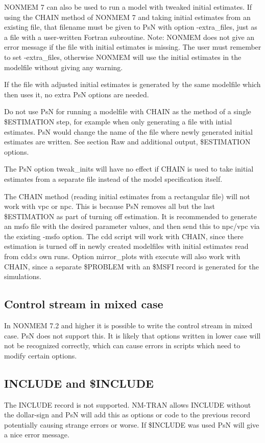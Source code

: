 	NONMEM 7 can also be used to run a model with tweaked initial estimates. If using the CHAIN method of NONMEM 7 and taking initial estimates from an existing file, that filename must be given to PsN with option -extra\_files, just as a file with a user-written Fortran subroutine. Note: NONMEM does not give an error message if the file with initial estimates is missing. The user must remember to set -extra\_files, otherwise NONMEM will use the initial estimates in the modelfile without giving any warning.
	
	If the file with adjusted initial estimates is generated by the same modelfile which then uses it, no extra PsN options are needed.
	
	Do not use PsN for running a modelfile with CHAIN as the method of a single \$ESTIMATION step, for example when only generating a file with intial estimates. PsN would change the name of the file where newly generated initial estimates are written. See section Raw and additional output, \$ESTIMATION options.
	
	The PsN option tweak\_inits will have no effect if CHAIN is used to take initial estimates from a separate file instead of the model specification itself.
	
	The CHAIN method (reading initial estimates from a rectangular file) will not work with vpc or npc. This is because PsN removes all but the last \$ESTIMATION as part of turning off estimation. It is recommended to generate an msfo file with the desired parameter values, and then send this to npc/vpc via the existing -msfo option. The cdd script will work with CHAIN, since there estimation is turned off in newly created modelfiles with initial estimates read from cdd:s own runs. Option mirror\_plots with execute will also work with CHAIN, since a separate \$PROBLEM with an \$MSFI record is generated for the simulations.
	
	\subsection{Control stream in mixed case}
	In NONMEM 7.2 and higher it is possible to write the control stream in mixed case. PsN does not support this. It is likely that options written in lower case will not be recognized correctly, which can cause errors in scripts which need to modify certain options.
	
	\subsection{INCLUDE and \$INCLUDE}
	The INCLUDE record is not supported. NM-TRAN allows INCLUDE without the dollar-sign and PsN will add this as options or code to the previous record potentially causing strange errors or worse. If \$INCLUDE was used PsN will give a nice error message.
	
